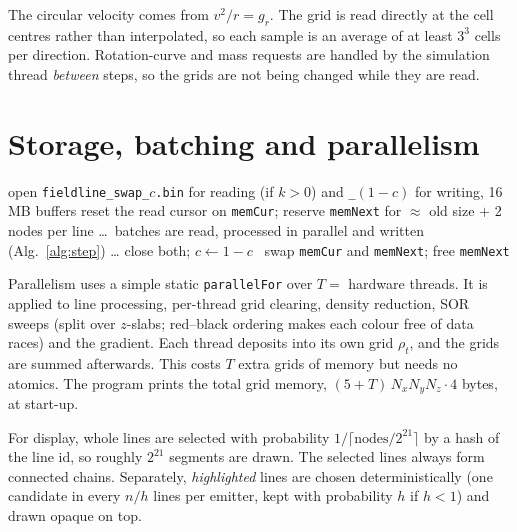 \documentclass[12pt]{article}
\begin{document}
The circular velocity comes from $v^2/r=g_r$. The grid is read directly at the
cell centres rather than interpolated, so each sample is an average of at least
$3^3$ cells per direction. Rotation-curve and mass requests are handled by the
simulation thread \emph{between} steps, so the grids are not being changed
while they are read.

\section{Storage, batching and parallelism}

\begin{algorithm}[htbp]
\caption{Stream management per step}
\begin{algorithmic}[1]
   \State open \texttt{fieldline\_swap\_}$c$\texttt{.bin} for reading (if $k>0$) and \texttt{\_}$(1{-}c)$ for writing, 16\,MB buffers
\Else
   \State reset the read cursor on \texttt{memCur}; reserve \texttt{memNext} for $\approx$ old size $+$ 2 nodes per line
\EndIf
\State \dots\ batches are read, processed in parallel and written (Alg.~\ref{alg:step}) \dots
{} close both; $c\gets1-c$ \Else\ swap \texttt{memCur} and \texttt{memNext}; free \texttt{memNext} \EndIf
\end{algorithmic}
\end{algorithm}

Parallelism uses a simple static \texttt{parallelFor} over
$T=$ hardware threads. It is applied to line processing, per-thread grid
clearing, density reduction, SOR sweeps (split over $z$-slabs; red--black
ordering makes each colour free of data races) and the gradient. Each thread deposits into
its own grid $\rho_t$, and the grids are summed afterwards. This costs $T$ extra grids of memory
but needs no atomics. The program prints the total grid memory, $(5+T)\,N_xN_yN_z\cdot4$
bytes, at start-up.

For display, whole lines are selected with probability $1/\lceil\text{nodes}/2^{21}\rceil$
by a hash of the line id, so roughly $2^{21}$ segments are drawn. The selected lines
always form connected chains. Separately, \emph{highlighted} lines are chosen
deterministically (one candidate in every $n/h$ lines per emitter, kept with
probability $h$ if $h<1$) and drawn opaque on top.

\end{document}
